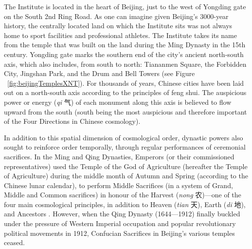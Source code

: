 \begin{CJK}{UTF8}{gbsn}
The Institute is located in the heart of Beijing, just to the west of Yongding gate on the South 2nd Ring Road. As one can imagine given Beijing's 3000-year history, the centrally located land on which the Institute sits was not always home to sport facilities and professional athletes.  The Institute takes its name from the temple that was built on the land during the Ming Dynasty in the 15th century.  Yongding gate marks the southern end of the city's ancient north-south axis, which also includes, from south to north: Tiananmen Square, the Forbidden City, Jingshan Park, and the Drum and Bell Towers (see Figure ~\ref{fig:beijingTemplesXNT}).  For thousands of years, Chinese cities have been laid out on a north-south axis according to the principles of feng shui. The auspicious power or energy (\textit{qi} 气) of each monument along this axis is believed to flow upward from the south (south being the most auspicious and therefore important of the Four Directions in Chinese cosmology).

In addition to this spatial dimension of cosmological order, dynastic powers also sought to reinforce order temporally, through regular performances of ceremonial sacrifices.  In the Ming and Qing Dynasties, Emperors (or their commissioned representatives) used the Temple of the God of Agriculture (hereafter the Temple of Agriculture) during the middle month of Autumn and Spring (according to the Chinese lunar calendar), to perform Middle Sacrifices (in a system of Grand, Middle and Common sacrifices) in honour of the Harvest (\textit{nong} 农)---one of the four main cosmological principles, in addition to Heaven (\textit{tian} 天), Earth (\textit{di} 地), and Ancestors \citep[\textit{zu} 祖; see][98]{Brownell2008}.  However, when the Qing Dynasty (1644---1912) finally buckled under the pressure of Western Imperial occupation and popular revolutionary political movements in 1912, Confucian Sacrifices in Beijing's various temples ceased.


\end{CJK}
